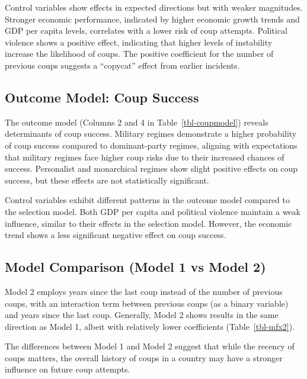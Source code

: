\documentclass[
  12pt,
]{report}
\begin{document}
Control variables show effects in expected directions but with weaker
magnitudes. Stronger economic performance, indicated by higher economic
growth trends and GDP per capita levels, correlates with a lower risk of
coup attempts. Political violence shows a positive effect, indicating
that higher levels of instability increase the likelihood of coups. The
positive coefficient for the number of previous coups suggests a
``copycat'' effect from earlier incidents.

\subsection{Outcome Model: Coup
Success}\label{outcome-model-coup-success}

The outcome model (Columns 2 and 4 in Table~\ref{tbl-coupmodel}) reveals
determinants of coup success. Military regimes demonstrate a higher
probability of coup success compared to dominant-party regimes, aligning
with expectations that military regimes face higher coup risks due to
their increased chances of success. Personalist and monarchical regimes
show slight positive effects on coup success, but these effects are not
statistically significant.

Control variables exhibit different patterns in the outcome model
compared to the selection model. Both GDP per capita and political
violence maintain a weak influence, similar to their effects in the
selection model. However, the economic trend shows a less significant
negative effect on coup success.

\subsection{Model Comparison (Model 1 vs Model
2)}\label{model-comparison-model-1-vs-model-2}

Model 2 employs years since the last coup instead of the number of
previous coups, with an interaction term between previous coups (as a
binary variable) and years since the last coup. Generally, Model 2 shows
results in the same direction as Model 1, albeit with relatively lower
coefficients (Table~\ref{tbl-mfx2}).

The differences between Model 1 and Model 2 suggest that while the
recency of coups matters, the overall history of coups in a country may
have a stronger influence on future coup attempts.

\clearpage

\begingroup
\setlength{}
\setlength{}\fontsize{12.0pt}{14.4pt}\selectfont
\setlength{\LTpost}{0mm}
\end{document}
